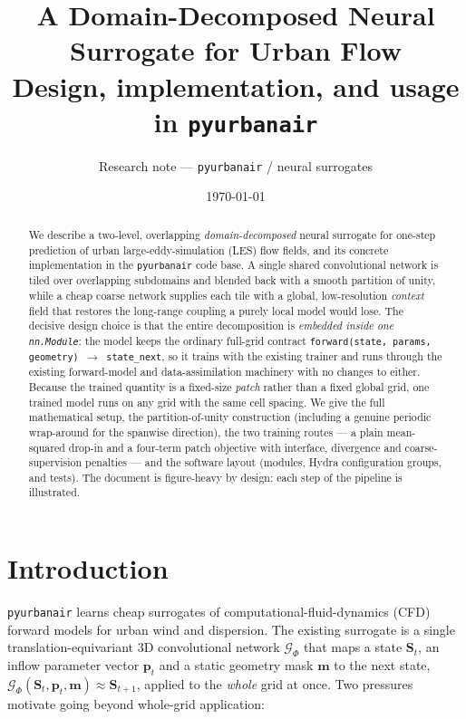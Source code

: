 \documentclass[11pt]{article}
\title{\vspace{-1.2cm}\textbf{A Domain-Decomposed Neural Surrogate for Urban Flow}\\[3pt]
\large Design, implementation, and usage in \texttt{pyurbanair}}
\author{Research note --- \texttt{pyurbanair} / neural surrogates}
\date{\today}
\newcommand{\Gfine}{\mathcal{G}_{\Phi}}
\newcommand{\code}[1]{\texttt{#1}}
\begin{document}
\maketitle
\vspace{-0.4cm}

\begin{abstract}
\noindent
We describe a two-level, overlapping \emph{domain-decomposed} neural surrogate for
one-step prediction of urban large-eddy-simulation (LES) flow fields, and its
concrete implementation in the \texttt{pyurbanair} code base. A single shared
convolutional network is tiled over overlapping subdomains and blended back with a
smooth partition of unity, while a cheap coarse network supplies each tile with a
global, low-resolution \emph{context} field that restores the long-range coupling
a purely local model would lose. The decisive design choice is that the entire
decomposition is \emph{embedded inside one \texttt{nn.Module}}: the model keeps the
ordinary full-grid contract \code{forward(state, params, geometry)\,$\to$\,state\_next},
so it trains with the existing trainer and runs through the existing forward-model
and data-assimilation machinery with no changes to either. Because the trained
quantity is a fixed-size \emph{patch} rather than a fixed global grid, one trained
model runs on any grid with the same cell spacing. We give the full mathematical
setup, the partition-of-unity construction (including a genuine periodic
wrap-around for the spanwise direction), the two training routes --- a plain
mean-squared drop-in and a four-term patch objective with interface, divergence and
coarse-supervision penalties --- and the software layout (modules, Hydra
configuration groups, and tests). The document is figure-heavy by design: each step
of the pipeline is illustrated.
\end{abstract}

\section{Introduction}\label{sec:intro}

\texttt{pyurbanair} learns cheap surrogates of computational-fluid-dynamics (CFD)
forward models for urban wind and dispersion. The existing surrogate is a single
translation-equivariant 3D convolutional network $\Gfine$ that maps a state
$\bm S_t$, an inflow parameter vector $\bm p_t$ and a static geometry mask $\bm m$
to the next state, $\Gfine(\bm S_t,\bm p_t,\bm m)\approx\bm S_{t+1}$, applied to the
\emph{whole} grid at once. Two pressures motivate going beyond whole-grid
application:
\end{document}
